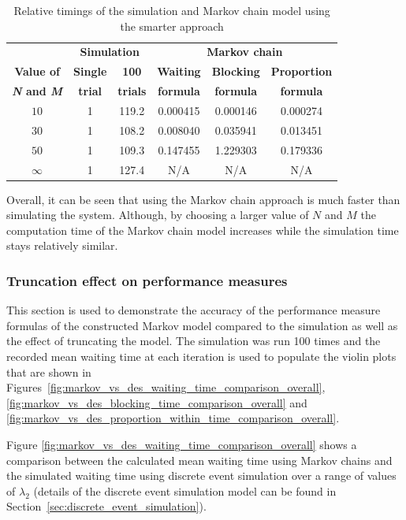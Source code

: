\tiny
\begin{table}[H]
    \centering
    \begin{tabular}{c|cc|ccc}
        & \multicolumn{2}{c}{\textbf{Simulation}} & 
        \multicolumn{3}{c}{\textbf{Markov chain}} \\
        \textbf{Value of} & \textbf{Single} & \textbf{100} & 
        \textbf{Waiting} & \textbf{Blocking} & 
        \textbf{Proportion} \\
        \textbf{\textit{N} and \textit{M}} & \textbf{trial} & \textbf{trials} & 
        \textbf{formula} & \textbf{formula} & \textbf{formula} \\
        \hline
        \(10\) & 1 & 119.2 & 0.000415 & 0.000146 & 0.000274 \\
        \hline
        \(30\) & 1 & 108.2 & 0.008040 & 0.035941 & 0.013451 \\
        \hline
        \(50\) & 1 & 109.3 & 0.147455 & 1.229303 & 0.179336 \\
        \hline
        \(\infty\) & 1 & 127.4 & N/A & N/A & N/A \\
    \end{tabular}
    \caption{Relative timings of the simulation and Markov chain model using
    the smarter approach}
    \label{tab:truncation_effect_timings_new}
\end{table}
\normalsize

Overall, it can be seen that using the Markov chain approach is much faster than
simulating the system.
Although, by choosing a larger value of \(N\) and \(M\) the computation time of
the Markov chain model increases while the simulation time stays relatively 
similar.

\subsubsection{Truncation effect on performance measures}

This section is used to demonstrate the accuracy of the performance measure
formulas of the constructed Markov model compared to the simulation as well as
the effect of truncating the model.
The simulation was run 100 times and the recorded mean waiting time at each
iteration is used to populate the violin plots that are shown in
Figures~\ref{fig:markov_vs_des_waiting_time_comparison_overall},
\ref{fig:markov_vs_des_blocking_time_comparison_overall} and
\ref{fig:markov_vs_des_proportion_within_time_comparison_overall}.

Figure \ref{fig:markov_vs_des_waiting_time_comparison_overall} shows a 
comparison between the calculated mean waiting time using Markov chains and the
simulated waiting time using discrete event simulation over a range of values of 
\(\lambda_2\) (details of the discrete event simulation model can be found in 
Section~\ref{sec:discrete_event_simulation}).

